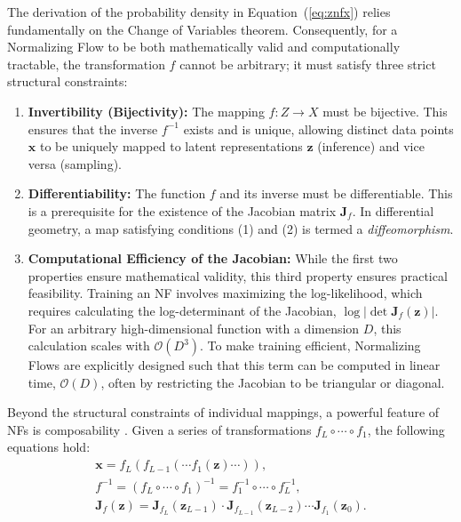 The derivation of the probability density in Equation~(\ref{eq:znfx}) relies fundamentally on the Change of Variables theorem. Consequently, for a Normalizing Flow to be both mathematically valid and computationally tractable, the transformation $f$ cannot be arbitrary; it must satisfy three strict structural constraints:
\begin{enumerate}
    \item \textbf{Invertibility (Bijectivity):} 
    The mapping $f: Z \to X$ must be bijective. This ensures that the inverse $f^{-1}$ exists and is unique, allowing distinct data points $\boldsymbol{x}$ to be uniquely mapped to latent representations $\boldsymbol{z}$ (inference) and vice versa (sampling).
    \item \textbf{Differentiability:} 
    The function $f$ and its inverse must be differentiable. This is a prerequisite for the existence of the Jacobian matrix $\boldsymbol{J}_f$. In differential geometry, a map satisfying conditions (1) and (2) is termed a \textit{diffeomorphism}.
    \item \textbf{Computational Efficiency of the Jacobian:} 
    While the first two properties ensure mathematical validity, this third property ensures practical feasibility. Training an \ac{NF} involves maximizing the log-likelihood, which requires calculating the log-determinant of the Jacobian, $\log |\det \boldsymbol{J}_f(\boldsymbol{z})|$. 
    For an arbitrary high-dimensional function with a dimension $D$, this calculation scales with $\mathcal{O}(D^3)$. To make training efficient, Normalizing Flows are explicitly designed such that this term can be computed in linear time, $\mathcal{O}(D)$, often by restricting the Jacobian to be triangular or diagonal.
\end{enumerate}
Beyond the structural constraints of individual mappings, a powerful feature of \acp{NF} is composability \citep{papamakarios2021nf}. Given a series of transformations $f_{L}\circ\cdots\circ f_{1}$, the following equations hold:
\begin{subequations}
    \begin{gather}
        \boldsymbol{x} = f_L(f_{L-1}(\cdots f_{1}(\boldsymbol{z})\cdots)), \\
        \label{eq:inverse_composition}
        f^{-1} = (f_L \circ \cdots \circ f_1)^{-1} = f_1^{-1} \circ \cdots \circ f_L^{-1}, \\
        \label{eq:jacobian_chain_rule}
        \boldsymbol{J}_{f}(\boldsymbol{z}) = \boldsymbol{J}_{f_L}(\boldsymbol{z}_{L-1}) \cdot \boldsymbol{J}_{f_{L-1}}(\boldsymbol{z}_{L-2}) \cdots \boldsymbol{J}_{f_1}(\boldsymbol{z}_0).
    \end{gather}
\end{subequations}
